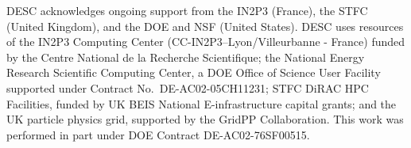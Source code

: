 DESC acknowledges ongoing support from the IN2P3 (France), the STFC 
(United Kingdom), and the DOE and NSF (United States).  
DESC uses resources of the IN2P3 Computing Center 
(CC-IN2P3--Lyon/Villeurbanne - France) funded by the Centre National de la
Recherche Scientifique; the National Energy Research Scientific Computing
Center, a DOE Office of Science User Facility supported under Contract 
No.\ DE-AC02-05CH11231; STFC DiRAC HPC Facilities, funded by UK BEIS National 
E-infrastructure capital grants; and the UK particle physics grid, supported
by the GridPP Collaboration.  This work was performed in part under DOE 
Contract DE-AC02-76SF00515.
